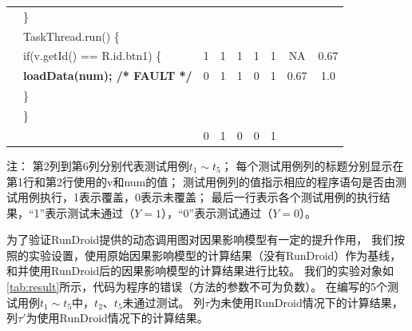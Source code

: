 \begin{table}[!ht]
\begin{center}
\begin{tabular}{|rl*{5} {|c}|c|c|}
			&\}                                              &   &   &   &   &   &      &             \\
			
			&TaskThread.run() \{                             &   &   &   &   &   &      &       \\
			
			&\quad if(v.getId() == R.id.btn1) \{                          & 1 & 1 & 1 & 1 & 1 &  NA   & 0.67 \\
			
			&\quad \quad \textbf{loadData(num); /* FAULT */} & 0 & 1 & 1 & 0 & 1 & 0.67    & 1.0  \\
			
			&\quad\}                                         &   &   &   &   &   &  &                \\
			
			&\}                                              &   &   &   &   &   &   &              \\
			
			\hline
			
			&                                                  & 0 & 1 & 0 & 0 & 1 &   &               \\
									\hline
		\end{tabular}
	\end{center}
\tiny
	注： 第2列到第6列分别代表测试用例$t_1\sim t_5$；
	每个测试用例列的标题分别显示在第1行和第2行使用的v和num的值；
	测试用例列的值指示相应的程序语句是否由测试用例执行，1表示覆盖，0表示未覆盖；   
	最后一行表示各个测试用例的执行结果，“1”表示测试未通过（$Y=1$），“0”表示测试通过（$Y=0$）。
	
\end{table}

为了验证RunDroid提供的动态调用图对因果影响模型有一定的提升作用，
我们按照\cite{baah2010causal,baah2011mitigating}的实验设置，使用原始因果影响模型的计算结果（没有RunDroid）作为基线，和并使用RunDroid后的因果影响模型的计算结果进行比较。
我们的实验对象如\autoref{tab:result}所示，代码为程序的错误（方法的参数不可为负数）。
在编写的5个测试用例$t_1\sim t_5$中，$t_2$、$ t_5$未通过测试。
列$\tau$为未使用RunDroid情况下的计算结果，列$\tau'$为使用RunDroid情况下的计算结果。


